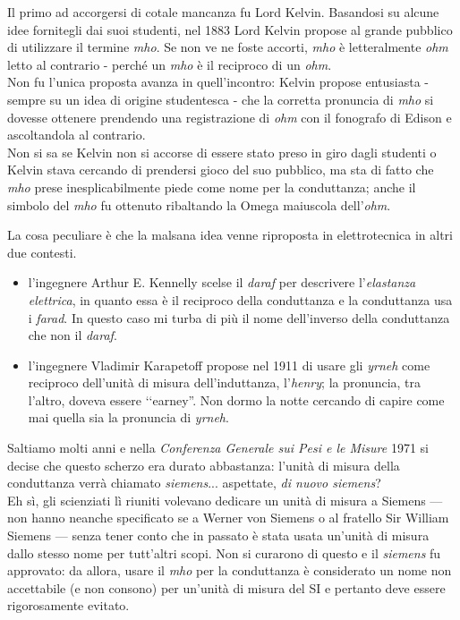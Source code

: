 \begin{digressionwt}
	Il primo ad accorgersi di cotale mancanza fu Lord Kelvin. Basandosi su alcune idee fornitegli dai suoi studenti,  nel 1883 Lord Kelvin propose al grande pubblico di utilizzare il termine \textit{mho}.	Se non ve ne foste accorti, \textit{mho} è letteralmente \textit{ohm} letto al contrario - perché un \textit{mho} è il reciproco di un \textit{ohm}.\\
	Non fu l'unica proposta avanza in quell'incontro: Kelvin propose entusiasta - sempre su un idea di origine studentesca - che la corretta pronuncia di \textit{mho} si dovesse ottenere prendendo una registrazione di \textit{ohm} con il fonografo di Edison e ascoltandola al contrario.\\
	Non si sa se Kelvin non si accorse di essere stato preso in giro dagli studenti o Kelvin stava cercando di prendersi gioco del suo pubblico, ma sta di fatto che \textit{mho} prese inesplicabilmente piede come nome per la conduttanza; anche il simbolo del \textit{mho} fu ottenuto ribaltando la Omega maiuscola dell'\textit{ohm}.

	La cosa peculiare è che la malsana idea venne riproposta in elettrotecnica in altri due contesti.
	\begin{itemize}
		\item l'ingegnere Arthur E. Kennelly scelse il \textit{daraf} per descrivere l'\textit{elastanza elettrica}, in quanto essa è il reciproco della conduttanza e la conduttanza usa i \textit{farad}. In questo caso mi turba di più il nome dell'inverso della conduttanza che non il \textit{daraf}.
		\item l'ingegnere Vladimir Karapetoff propose nel 1911 di usare gli \textit{yrneh} come reciproco dell'unità di misura dell'induttanza, l'\textit{henry}; la pronuncia, tra l'altro, doveva essere ‘‘earney''. Non dormo la notte cercando di capire come mai quella sia la pronuncia di \textit{yrneh}.
	\end{itemize}
	Saltiamo molti anni e nella \textit{Conferenza Generale sui Pesi e le Misure} 1971 si decise che questo scherzo era durato abbastanza: l'unità di misura della conduttanza verrà chiamato \textit{siemens}... aspettate, \textit{di nuovo siemens}?\\
	Eh sì, gli scienziati lì riuniti volevano dedicare un unità di misura a Siemens --- non hanno neanche specificato se a Werner von Siemens o al fratello Sir William Siemens --- senza tener conto che in passato è stata usata un'unità di misura dallo stesso nome per tutt'altri scopi. Non si curarono di questo e il \textit{siemens} fu approvato: da allora, usare il \textit{mho} per la conduttanza è considerato un nome non accettabile (e non consono) per un'unità di misura del SI e pertanto deve essere rigorosamente evitato.
\end{digressionwt} %
